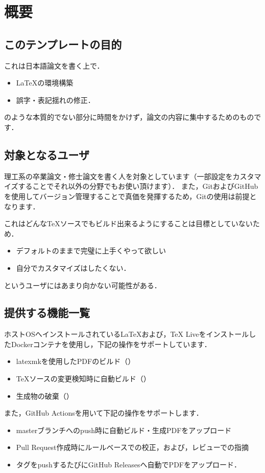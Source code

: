 \documentclass[main]{subfiles}
\begin{document}
\section{概要}

\subsection{このテンプレートの目的}

これは日本語論文を書く上で．

\begin{itemize}
    \item LaTeXの環境構築
    \item 誤字・表記揺れの修正．
\end{itemize}

のような本質的でない部分に時間をかけず，論文の内容に集中するためのものです．

\subsection{対象となるユーザ}
理工系の卒業論文・修士論文を書く人を対象としています（一部設定をカスタマイズすることでそれ以外の分野でもお使い頂けます）．
また，GitおよびGitHubを使用してバージョン管理することで真価を発揮するため，Gitの使用は前提となります．


これはどんなTeXソースでもビルド出来るようにすることは目標としていないため．

\begin{itemize}
    \item デフォルトのままで完璧に上手くやって欲しい
    \item 自分でカスタマイズはしたくない．
\end{itemize}

というユーザにはあまり向かない可能性がある．

\subsection{提供する機能一覧}

ホストOSへインストールされているLaTeXおよび，TeX LiveをインストールしたDockerコンテナを使用し，下記の操作をサポートしています．

\begin{itemize}
    \item latexmkを使用したPDFのビルド（）
    \item TeXソースの変更検知時に自動ビルド（）
    \item 生成物の破棄（）
\end{itemize}

また，GitHub Actionsを用いて下記の操作をサポートします．

\begin{itemize}
    \item masterブランチへのpush時に自動ビルド・生成PDFをアップロード
    \item Pull Request作成時にルールベースでの校正，および，レビューでの指摘
    \item タグをpushするたびにGitHub Releasesへ自動でPDFをアップロード．
\end{itemize}
\end{document}
